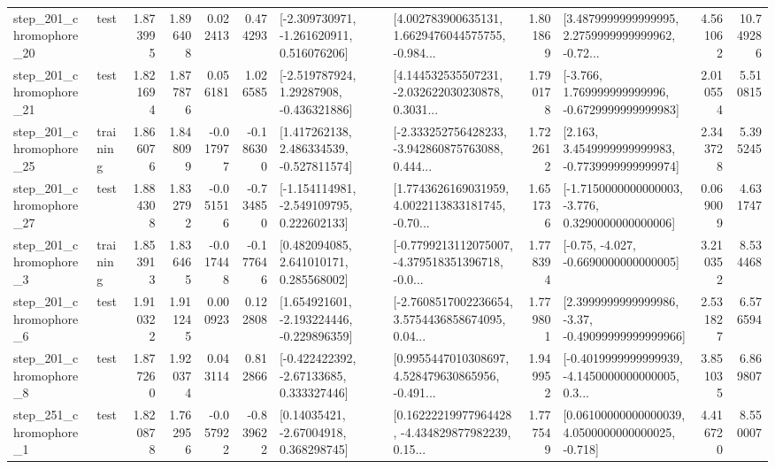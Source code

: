 \begin{tabular}{llrrrrllrlrr}
  step\_201\_chromophore\_20 &      test &      1.873995 &    1.896408 &      0.022413 &  0.474293 &   [-2.309730971, -1.261620911, 0.516076206] &  [4.002783900635131, 1.6629476044575755, -0.984... &       1.801869 &  [3.4879999999999995, 2.2759999999999962, -0.72... &            4.561062 &         10.749286 \\
  step\_201\_chromophore\_21 &      test &      1.821694 &    1.877876 &      0.056181 &  1.026585 &    [-2.519787924, 1.29287908, -0.436321886] &  [4.144532535507231, -2.032622030230878, 0.3031... &       1.790178 &   [-3.766, 1.769999999999996, -0.6729999999999983] &            2.010554 &          5.510815 \\
  step\_201\_chromophore\_25 &  training &      1.866076 &    1.848099 &     -0.017977 & -0.186300 &    [1.417262138, 2.486334539, -0.527811574] &  [-2.333252756428233, -3.942860875763088, 0.444... &       1.722612 &   [2.163, 3.4549999999999983, -0.7739999999999974] &            2.343728 &          5.395245 \\
  step\_201\_chromophore\_27 &      test &      1.884308 &    1.832792 &     -0.051516 & -0.734850 &   [-1.154114981, -2.549109795, 0.222602133] &  [1.7743626169031959, 4.0022113833181745, -0.70... &       1.651736 &  [-1.7150000000000003, -3.776, 0.3290000000000006] &            0.069009 &          4.631747 \\
   step\_201\_chromophore\_3 &  training &      1.853913 &    1.836465 &     -0.017448 & -0.177646 &     [0.482094085, 2.641010171, 0.285568002] &  [-0.7799213112075007, -4.379518351396718, -0.0... &       1.778394 &               [-0.75, -4.027, -0.6690000000000005] &            3.210352 &          8.534468 \\
   step\_201\_chromophore\_6 &      test &      1.910322 &    1.911245 &      0.000923 &  0.122808 &   [1.654921601, -2.193224446, -0.229896359] &  [-2.7608517002236654, 3.5754436858674095, 0.04... &       1.779801 &  [2.3999999999999986, -3.37, -0.49099999999999966] &            2.531827 &          6.576594 \\
   step\_201\_chromophore\_8 &      test &      1.877260 &    1.920374 &      0.043114 &  0.812866 &    [-0.422422392, -2.67133685, 0.333327446] &  [0.9955447010308697, 4.528479630865956, -0.491... &       1.949952 &  [-0.4019999999999939, -4.1450000000000005, 0.3... &            3.851035 &          6.869807 \\
   step\_251\_chromophore\_1 &      test &      1.820878 &    1.762956 &     -0.057922 & -0.839622 &      [0.14035421, -2.67004918, 0.368298745] &  [0.16222219977964428, -4.434829877982239, 0.15... &       1.777549 &  [0.06100000000000039, 4.0500000000000025, -0.718] &            4.416720 &          8.550007 \\

\end{tabular}
